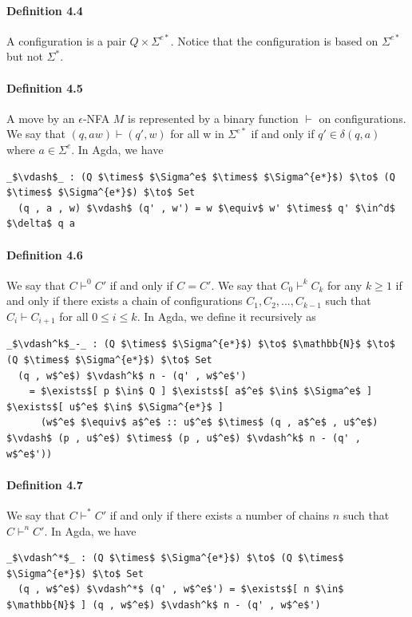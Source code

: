 \documentclass[twoside,openright,final]{bhamthesis}
\begin{document}
\paragraph{Definition 4.4} A configuration is a pair \(Q \times
\Sigma^{e*}\). Notice that the configuration is based on
\(\Sigma^{e*}\) but not \(\Sigma^*\).

\paragraph{Definition 4.5} A move by an \(\epsilon\)-NFA \(M\) is
represented by a binary function \(\vdash\) on configurations. We say
that \((q, aw) \vdash (q' , w)\) for all w in \(\Sigma^{e*}\)
if and only if \(q' \in \delta (q , a)\) where \(a \in \Sigma^e\). In
Agda, we have
\begin{lstlisting}[mathescape=true,aboveskip=0pt,belowskip=0pt]
  _$\vdash$_ : (Q $\times$ $\Sigma^e$ $\times$ $\Sigma^{e*}$) $\to$ (Q $\times$ $\Sigma^{e*}$) $\to$ Set
  (q , a , w) $\vdash$ (q' , w') = w $\equiv$ w' $\times$ q' $\in^d$ $\delta$ q a
\end{lstlisting}

\paragraph{Definition 4.6} We say that \(C \vdash^0 C'\) if and only
if \(C = C'\). We say that \(C_0 \vdash^k C_k\) for any \(k \geq 1\) if and only if there exists a chain of
configurations \(C_1, C_2, ..., C_{k-1}\) such that \(C_i \vdash
C_{i+1}\) for all \(0 \leq i \leq k\). In Agda, we define it
recursively as
\begin{lstlisting}[mathescape=true,aboveskip=0pt,belowskip=0pt]
  _$\vdash^k$_-_ : (Q $\times$ $\Sigma^{e*}$) $\to$ $\mathbb{N}$ $\to$ (Q $\times$ $\Sigma^{e*}$) $\to$ Set
  (q , w$^e$) $\vdash^k$ n - (q' , w$^e$') 
    = $\exists$[ p $\in$ Q ] $\exists$[ a$^e$ $\in$ $\Sigma^e$ ] $\exists$[ u$^e$ $\in$ $\Sigma^{e*}$ ]
      (w$^e$ $\equiv$ a$^e$ :: u$^e$ $\times$ (q , a$^e$ , u$^e$) $\vdash$ (p , u$^e$) $\times$ (p , u$^e$) $\vdash^k$ n - (q' , w$^e$'))
\end{lstlisting}

\paragraph{Definition 4.7} We say that \(C \vdash^* C'\) if and only
if there exists a number of chains \(n\) such that \(C \vdash^n C'\). In Agda,
we have
\begin{lstlisting}[mathescape=true,aboveskip=0pt,belowskip=0pt]
  _$\vdash^*$_ : (Q $\times$ $\Sigma^{e*}$) $\to$ (Q $\times$ $\Sigma^{e*}$) $\to$ Set
  (q , w$^e$) $\vdash^*$ (q' , w$^e$') = $\exists$[ n $\in$ $\mathbb{N}$ ] (q , w$^e$) $\vdash^k$ n - (q' , w$^e$')
\end{lstlisting}
\end{document}
